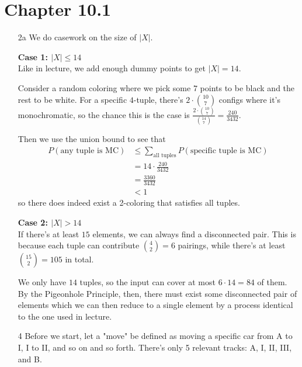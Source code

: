 \documentclass[12pt]{article}
\begin{document}
\section{Chapter 10.1}

\begin{enumerate}
    \item[2a] We do casework on the size of $|X|$.

        \textbf{Case 1: $|X| \le 14$} \\
        Like in lecture, we add enough dummy points to get $|X|=14$.


        Consider a random coloring where we pick some $7$ points to be black and the rest to be white.
        For a specific $4$-tuple, there's $2 \cdot \binom{10}{7}$ configs where
        it's monochromatic, so the chance this is the case is $\frac{2 \cdot \binom{10}{7}}{\binom{14}{7}}=\frac{240}{3432}$.

        Then we use the union bound to see that
        \begin{align*}
            P(\text{any tuple is MC})
             & \le \sum_{\text{all tuples}} P(\text{specific tuple is MC}) \\
             & = 14 \cdot \frac{240}{3432}                                 \\
             & = \frac{3360}{3432}                                         \\
             & < 1
        \end{align*}
        so there does indeed exist a 2-coloring that satisfies all tuples.

        \textbf{Case 2: $|X| > 14$} \\
        If there's at least $15$ elements, we can always find a disconnected pair.
        This is because each tuple can contribute $\binom{4}{2}=6$ pairings,
        while there's at least $\binom{15}{2}=105$ in total.

        We only have $14$ tuples, so the input can cover at most $6 \cdot 14=84$ of them.
        By the Pigeonhole Principle, then, there must exist some disconnected pair
        of elements which we can then reduce to a single element
        by a process identical to the one used in lecture.

    \item[4] Before we start, let a "move" be defined as moving a specific car from
        A to I, I to II, and so on and so forth.
        There's only 5 relevant tracks: A, I, II, III, and B.


\end{enumerate}
\end{document}
